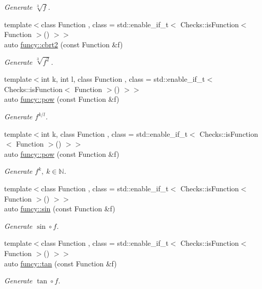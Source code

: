 \begin{DoxyCompactItemize}
\begin{DoxyCompactList}\small\item\em Generate $ \sqrt[3]{f} $. \end{DoxyCompactList}\item 
{\footnotesize template$<$class Function , class  = std\-::enable\-\_\-if\-\_\-t$<$ Checks\-::is\-Function$<$ Function $>$() $>$$>$ }\\auto \hyperlink{group__CMathGroup_ga3a4ba572754c0310c41949f2a4091046}{funcy\-::cbrt2} (const Function \&f)
\begin{DoxyCompactList}\small\item\em Generate $ \sqrt[3]{f^2}$. \end{DoxyCompactList}\item 
{\footnotesize template$<$int k, int l, class Function , class  = std\-::enable\-\_\-if\-\_\-t$<$ Checks\-::is\-Function$<$ Function $>$() $>$$>$ }\\auto \hyperlink{group__CMathGroup_gaa667967d67586d6d5fc733a978f9ab06}{funcy\-::pow} (const Function \&f)
\begin{DoxyCompactList}\small\item\em Generate $ f^{k/l} $. \end{DoxyCompactList}\item 
{\footnotesize template$<$int k, class Function , class  = std\-::enable\-\_\-if\-\_\-t$<$ Checks\-::is\-Function$<$ Function $>$() $>$$>$ }\\auto \hyperlink{group__CMathGroup_ga8e9aacbacd848ce8c87ceba957a666a7}{funcy\-::pow} (const Function \&f)
\begin{DoxyCompactList}\small\item\em Generate $ f^k,\ k\in\mathbb{N}$. \end{DoxyCompactList}\item 
{\footnotesize template$<$class Function , class  = std\-::enable\-\_\-if\-\_\-t$<$ Checks\-::is\-Function$<$ Function $>$() $>$$>$ }\\auto \hyperlink{group__CMathGroup_gace9a6a15d1fd5071d13272e57d096b2c}{funcy\-::sin} (const Function \&f)
\begin{DoxyCompactList}\small\item\em Generate $ \sin\circ f $. \end{DoxyCompactList}\item 
{\footnotesize template$<$class Function , class  = std\-::enable\-\_\-if\-\_\-t$<$ Checks\-::is\-Function$<$ Function $>$() $>$$>$ }\\auto \hyperlink{group__CMathGroup_ga12e1ac095ec148de81e84e58bcce5d21}{funcy\-::tan} (const Function \&f)
\begin{DoxyCompactList}\small\item\em Generate $ \tan\circ f $. \end{DoxyCompactList}\end{DoxyCompactItemize}


